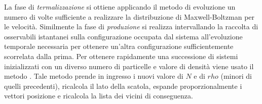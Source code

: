 \medskip\newline
La fase di \emph{termalizzazione} si ottiene applicando il metodo di evoluzione un numero di volte sufficiente a realizzare la distribuzione di Maxwell-Boltzman per le velocità.
\medskip\newline
Similmente la fase di \emph{produzione} si realizza intervallando la raccolta di osservabili istantanei sulla configurazione occupata dal sistema all'evoluzione temporale necessaria per ottenere un'altra configurazione sufficientemente scorrelata dalla prima.
\medskip\newline
Per ottenere rapidamente una successione di sistemi inizializzati con un diverso numero di particelle e valore di densità viene usato il metodo . Tale metodo prende in ingresso i nuovi valore di $N$ e di $rho$ (minori di quelli precedenti), ricalcola il lato della scatola, espande proporzionalmente i vettori posizione e ricalcola la lista dei vicini di conseguenza.



\FloatBarrier 
